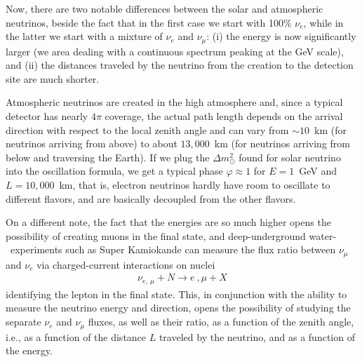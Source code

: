 \begin{marginfigure}
  
  \caption{Sketch of an underground neutrino detector (not to scale). The Dashed
  line represents the average altitude where neutrinos are created within the
  Earth atmosphere.}
  \label{fig:atmospheric_nu_sketch}
\end{marginfigure}

Now, there are two notable differences between the solar and atmospheric neutrinos,
beside the fact that in the first case we start with 100\% $\nu_e$, while in the latter
we start with a mixture of $\nu_e$ and $\nu_\mu$: (i) the energy is now significantly
larger (we area dealing with a continuous spectrum peaking at the GeV scale), and
(ii) the distances traveled by the neutrino from the creation to the detection site are
much shorter.

\begin{marginfigure}
  
  \caption{Distance traverse by atmospheric neutrinos between the creation and
  the detection site as a function of the cosine director with respect to the local
  zenith. The plot assumes an average altitude $h = 15$~km for the
  neutrino creation and a detector $2.5$~km underground.}
  \label{fig:atmospheric_nu_sketch}
\end{marginfigure}

Atmospheric neutrinos are created in the high atmosphere and, since a typical detector
has nearly $4\pi$ coverage, the actual path length depends on the arrival direction
with respect to the local zenith angle and can vary from $\sim 10$~km (for neutrinos
arriving from above) to about $13,000$~km (for neutrinos arriving from below and
traversing the Earth).
If we plug the $\Delta m^2_\odot$ found for solar neutrino into the oscillation formula,
we get a typical phase $\varphi \approx 1$ for $E = 1$~GeV and $L = 10,000$~km,
that is, electron neutrinos hardly have room to oscillate to different flavors, and
are basically decoupled from the other flavors.

On a different note, the fact that the energies are so much higher opens the possibility
of creating muons in the final state, and deep-underground water-\cherenkov~experiments
such as Super Kamiokande can measure the flux ratio between $\nu_\mu$ and $\nu_e$ via
charged-current interactions on nuclei
\begin{align*}
  \nu_{e,~\mu} + N \rightarrow e~,\mu + X
\end{align*}
identifying the lepton in the final state. This, in conjunction with the ability to
measure the neutrino energy and direction, opens the possibility of studying the
separate $\nu_e$ and $\nu_\mu$ fluxes, as well as their ratio, as a function of the
zenith angle, i.e., as a function of the distance $L$ traveled by the neutrino,
and as a function of the energy.

